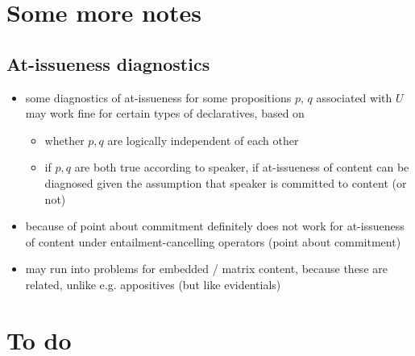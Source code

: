 \documentclass[11pt]{article}
\begin{document}




\section{Some more notes} %
	
	\subsection{At-issueness diagnostics} %
		
		\begin{itemize}
			\item some diagnostics of at-issueness for some propositions $p$, $q$ associated with $U$  may work fine for certain types of declaratives, based on
			\begin{itemize}
				\item whether $p, q$ are logically independent of each other
				\item if $p, q$ are both true according to speaker, if at-issueness of content can be diagnosed given the assumption that speaker is committed to content (or not)
			\end{itemize}

			\item because of point about commitment definitely does not work for at-issueness of content under entailment-cancelling operators (point about commitment)

			\item may run into problems for embedded / matrix content, because these are related, unlike e.g. appositives (but like evidentials)

		\end{itemize}
	




\section{To do} %
	
\end{document}

